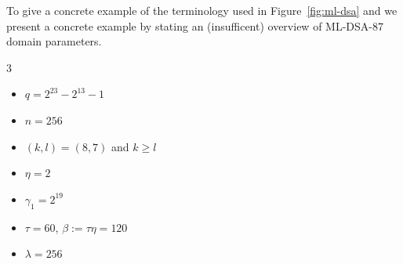 To give a concrete example of the terminology used in Figure~\ref{fig:ml-dsa} and we present a concrete example by stating an (insufficent) overview of ML-DSA-87 domain parameters.

\begin{multicols}{3}
\begin{itemize}
    \item \(q = 2^{23}-2^{13}-1\)
    \item \(n=256\)
    \item \((k,l) = (8,7)\) and \(k\geq l\)
    \item \(\eta = 2\)
    \item \(\gamma_1 = 2^{19}\)
    \item \(\tau = 60\), \(\beta:=\tau\eta = 120\)
    \item \(\lambda=256\)
\end{itemize}
\end{multicols}

